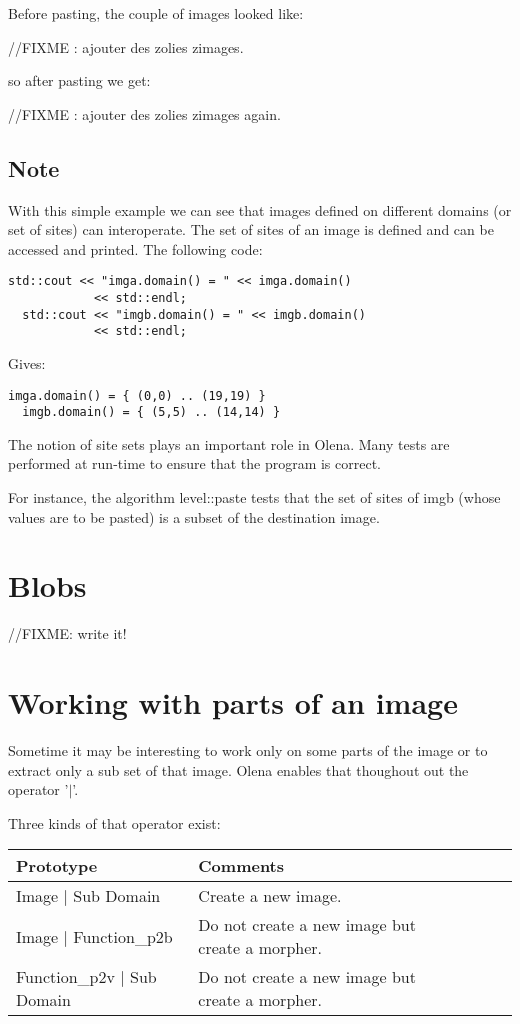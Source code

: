\documentclass{report}
\begin{document}
Before pasting, the couple of images looked like:

//FIXME : ajouter des zolies zimages.

so after pasting we get:

//FIXME : ajouter des zolies zimages again.

\subsection*{Note}
With this simple example we can see that images defined on different domains (or
set of sites) can interoperate.  The set of sites of an image is defined and
can be accessed and printed. The following code:

\begin{lstlisting}[frame=single]
  std::cout << "imga.domain() = " << imga.domain()
            << std::endl;
  std::cout << "imgb.domain() = " << imgb.domain()
            << std::endl;
\end{lstlisting}

Gives:
\begin{lstlisting}[frame=single]
  imga.domain() = { (0,0) .. (19,19) }
  imgb.domain() = { (5,5) .. (14,14) }
\end{lstlisting}

The notion of site sets plays an important role in Olena. Many tests are
performed at run-time to ensure that the program is correct.

For instance, the algorithm level::paste tests that the set of sites of imgb
(whose values are to be pasted) is a subset of the destination image.


\section{Blobs}
//FIXME: write it!

\newpage
\section{Working with parts of an image}

Sometime it may be interesting to work only on some parts of the image or to
extract only a sub set of that image. Olena enables that thoughout out the
operator '$|$'.

Three kinds of that operator exist:\\

\begin{tabular}{|l|l|l|l|p{4cm}|}
\hline
Prototype & Comments \\ \hline

Image $|$ Sub Domain & Create a new image.\\ \hline
Image $|$ Function\_p2b & Do not create a new image but create a morpher.\\
\hline
Function\_p2v $|$ Sub Domain & Do not create a new image but create a morpher.\\
\hline
\end{tabular} \\
\end{document}
